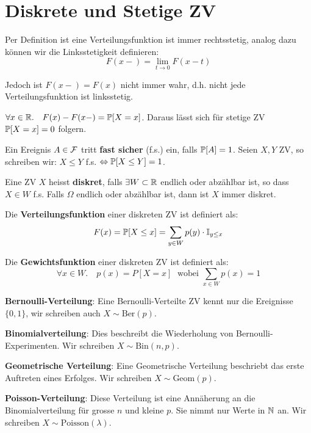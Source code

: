 \section{Diskrete und Stetige ZV}

Per Definition ist eine Verteilungsfunktion ist immer rechtsstetig, analog dazu können wir die Linksstetigkeit definieren: 
$$F(x-) = \lim_{t \to 0} F(x-t)$$ 

Jedoch ist $F(x-) = F(x)$ nicht immer wahr, d.h. nicht jede Verteilungsfunktion ist linksstetig. \medskip

\Satz $\forall x \in \mathbb{R}. \quad F(x) - F(x-) = \mathbb{P}[X = x]$. Daraus lässt sich für stetige ZV $\mathbb{P}[X = x] = 0$ folgern.


Ein Ereignis $A \in \mathcal{F}$ tritt \textbf{fast sicher} (f.s.) ein, falls $\mathbb{P}[A] = 1$. Seien $X,Y$ ZV, so schreiben wir: $X \leq Y$ f.s. $\Leftrightarrow \mathbb{P}[X \leq Y] = 1$.



\begin{tcolorbox}
    Eine ZV $X$ heisst \textbf{diskret}, falls $\exists W \subset \mathbb{R}$ endlich oder abzählbar ist, so dass $X \in W$ f.s. Falls $\Omega$ endlich oder abzählbar ist, dann ist $X$ immer diskret.
\end{tcolorbox}

Die \textbf{Verteilungsfunktion} einer diskreten ZV ist definiert als: 
$$F(x) = \mathbb{P}[X \leq x] = \sum_{y \in W} p(y) \cdot \mathbb I_{y \leq x}$$

Die \textbf{Gewichtsfunktion} einer diskreten ZV ist definiert als: 
$$\forall x \in W. \quad p(x) = P[X = x] \; \text{ wobei } \sum_{x \in W} p(x) = 1$$



\textbf{Bernoulli-Verteilung}: Eine Bernoulli-Verteilte ZV kennt nur die Ereignisse $\{0,1\}$, wir schreiben auch $X \sim \text{Ber}(p)$. \medskip

\textbf{Binomialverteilung}: Dies beschreibt die Wiederholung von Bernoulli-Experimenten. Wir schreiben $X \sim \text{Bin}(n,p)$. \medskip

\textbf{Geometrische Verteilung}: Eine Geometrische Verteilung beschriebt das erste Auftreten eines Erfolges. Wir schreiben $X \sim \text{Geom}(p)$. \medskip

\textbf{Poisson-Verteilung}: Diese Verteilung ist eine Annäherung an die Binomialverteilung für grosse $n$ und kleine $p$. Sie nimmt nur Werte in $\mathbb{N}$ an. Wir schreiben $X \sim \text{Poisson}(\lambda)$. \medskip



